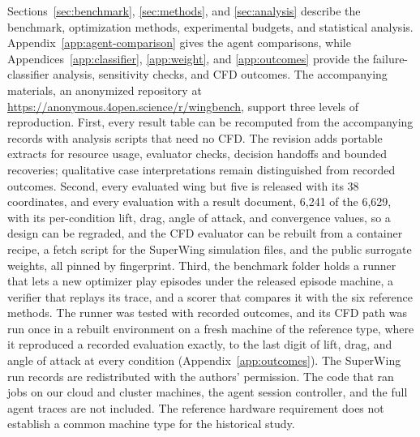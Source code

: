 \documentclass{article} %
\begin{document}
Sections~\ref{sec:benchmark}, \ref{sec:methods}, and \ref{sec:analysis} describe
the benchmark, optimization methods, experimental budgets, and statistical
analysis. Appendix~\ref{app:agent-comparison}
gives the agent comparisons, while
Appendices~\ref{app:classifier}, \ref{app:weight}, and \ref{app:outcomes}
provide the failure-classifier analysis, sensitivity checks, and CFD outcomes.
The accompanying materials, an anonymized repository at
\url{https://anonymous.4open.science/r/wingbench}, support three levels of
reproduction. First, every
result table can be recomputed from the accompanying records with analysis
scripts that need no CFD. The revision adds portable extracts for resource
usage, evaluator checks, decision handoffs and bounded recoveries; qualitative
case interpretations remain distinguished from recorded outcomes. Second, every evaluated wing but five is released with its 38 coordinates, and
every evaluation with a result document, 6{,}241 of the 6{,}629, with its per-condition lift, drag,
angle of attack, and convergence values, so a design can be regraded, and
the CFD evaluator can be rebuilt from a container recipe, a fetch script for the
SuperWing simulation files, and the public surrogate weights, all pinned by
fingerprint. Third, the benchmark folder holds a runner that lets a new
optimizer play episodes under the released episode machine, a verifier that
replays its trace, and a scorer that compares it with the six reference methods.
The runner was tested with recorded outcomes, and its CFD path was run
once in a rebuilt environment on a fresh machine of the reference type, where
it reproduced a recorded evaluation exactly, to the last digit of lift, drag,
and angle of attack at every condition (Appendix~\ref{app:outcomes}). The
SuperWing run records are redistributed with the authors' permission. The code
that ran jobs on our cloud and cluster machines, the agent session controller,
and the full agent traces are not included. The reference hardware requirement
does not establish a common machine type for the historical study.
\end{document}
